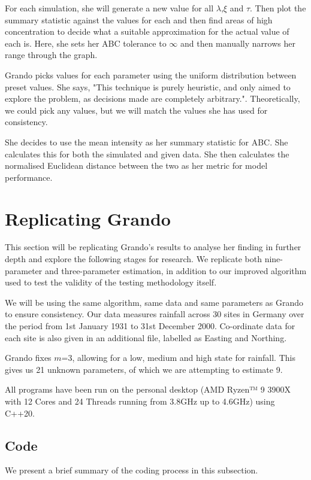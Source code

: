     For each simulation, she will generate a new value for all $\lambda$,$\xi$ and $\tau$. Then plot the summary statistic against the values for each and then find areas of high concentration to decide what a suitable approximation for the actual value of each is. Here, she sets her ABC tolerance to $\infty$ and then manually narrows her range through the graph.

    Grando picks values for each parameter using the uniform distribution between preset values. She says, "This technique is purely heuristic, and only aimed to explore the problem, as decisions made are completely arbitrary.". Theoretically, we could pick any values, but we will match the values she has used for consistency.  

    She decides to use the mean intensity as her summary statistic for ABC. She calculates this for both the simulated and given data. She then calculates the normalised Euclidean distance between the two as her metric for model performance.


\section{Replicating Grando}
\label{Replicating_Existing_Rainfall_Model:Replicating_Grando}
This section will be replicating Grando's results to analyse her finding in further depth and explore the following stages for research. We replicate both nine-parameter and three-parameter estimation, in addition to our improved algorithm used to test the validity of the testing methodology itself.

We will be using the same algorithm, same data and same parameters as Grando to ensure consistency. Our data measures rainfall across 30 sites in Germany over the period from 1st January 1931 to 31st December 2000. Co-ordinate data for each site is also given in an additional file, labelled as Easting and Northing. 

Grando fixes $m$=3, allowing for a low, medium and high state for rainfall. This gives us 21 unknown parameters, of which we are attempting to estimate 9.

All programs have been run on the personal desktop (AMD Ryzen™ 9 3900X with 12 Cores and 24 Threads running from 3.8GHz up to 4.6GHz) using C++20.


    \subsection{Code}
    \label{Replicating_Existing_Rainfall_Model:Replicating_Grando:Code}
    We present a brief summary of the coding process in this subsection.

